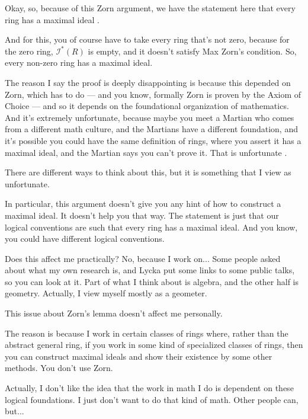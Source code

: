 \begin{speech}[00:45:22 - 00:46:53]
Okay, so, because of this Zorn argument, we have the statement here that every ring has a maximal ideal .

And for this, you of course have to take every ring that's not zero, because for the zero ring, $\mathscr{I}^*(R)$ is empty, and it doesn't satisfy Max Zorn's condition. So, every non-zero ring has a maximal ideal.

The reason I say the proof is deeply disappointing is because this depended on Zorn, which has to do --- and you know, formally Zorn is proven by the Axiom of Choice --- and so it depends on the foundational organization of mathematics. And it's extremely unfortunate, because maybe you meet a Martian who comes from a different math culture, and the Martians have a different foundation, and it's possible you could have the same definition of rings, where you assert it has a maximal ideal, and the Martian says you can't prove it. That is unfortunate .

There are different ways to think about this, but it is something that I view as unfortunate.

In particular, this argument doesn't give you any hint of how to construct a maximal ideal. It doesn't help you that way. The statement is just that our logical conventions are such that every ring has a maximal ideal. And you know, you could have different logical conventions.
\end{speech}

\begin{speech}[00:46:52 - 00:47:51]
Does this affect me practically? No, because I work on... Some people asked about what my own research is, and Lycka put some links to some public talks, so you can look at it. Part of what I think about is algebra, and the other half is geometry. Actually, I view myself mostly as a geometer.

This issue about Zorn's lemma doesn't affect me personally.

The reason is because I work in certain classes of rings where, rather than the abstract general ring, if you work in some kind of specialized classes of rings, then you can construct maximal ideals and show their existence by some other methods. You don't use Zorn.

Actually, I don't like the idea that the work in math I do is dependent on these logical foundations. I just don't want to do that kind of math. Other people can, but...
\end{speech}

